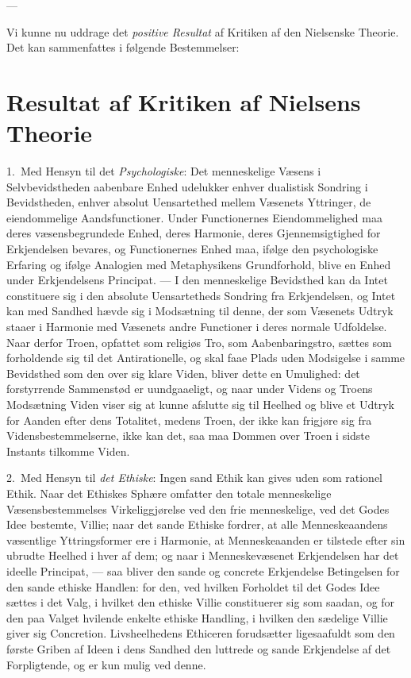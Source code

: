 \documentclass[12pt,a4paper]{book}
\newcommand{\opage}[1]{\marginnote{\footnotesize\textit{[#1]}}}
\begin{document}
\begin{center}---\end{center}

Vi kunne nu uddrage det \emph{positive Resultat} af Kritiken af den Nielsenske Theorie. Det kan
sammenfattes i følgende Bestemmelser:

\section{Resultat af Kritiken af Nielsens Theorie}
\label{sec:nielsen-resultat}

1.~Med Hensyn til det \emph{Psychologiske}: Det menneskelige Væsens i Selvbevidstheden
aabenbare Enhed udelukker enhver dualistisk Sondring i Bevidstheden, enhver absolut
Uensartethed mellem Væsenets Yttringer, de eiendommelige Aandsfunctioner. Under Functionernes
Eiendommelighed maa deres væsensbegrundede Enhed, deres Harmonie, deres Gjennemsigtighed for
Erkjendelsen bevares, og Functionernes Enhed maa, ifølge den psychologiske Erfaring og ifølge
Analogien med Metaphysikens Grundforhold, blive en Enhed under Erkjendelsens Principat. --- I
den menneskelige Bevidsthed kan da Intet constituere sig i den absolute Uensartetheds Sondring
fra Erkjendelsen, og Intet kan med Sandhed hævde sig i Modsætning til denne, der \opage{211}som Væsenets
Udtryk staaer i Harmonie med Væsenets andre Functioner i deres normale Udfoldelse. Naar derfor
Troen, opfattet som religiøs Tro, som Aabenbaringstro, sættes som forholdende sig til det
Antirationelle, og skal faae Plads uden Modsigelse i samme Bevidsthed som den over sig klare
Viden, bliver dette en Umulighed: det forstyrrende Sammenstød er uundgaaeligt, og naar under
Videns og Troens Modsætning Viden viser sig at kunne afslutte sig til Heelhed og blive et
Udtryk for Aanden efter dens Totalitet, medens Troen, der ikke kan frigjøre sig fra
Vidensbestemmelserne, ikke kan det, saa maa Dommen over Troen i sidste Instants tilkomme Viden.

2.~Med Hensyn til \emph{det Ethiske}: Ingen sand Ethik kan gives uden som rationel Ethik. Naar
det Ethiskes Sphære omfatter den totale menneskelige Væsensbestemmelses Virkeliggjørelse ved
den frie menneskelige, ved det Godes Idee bestemte, Villie; naar det sande Ethiske fordrer, at
alle Menneskeaandens væsentlige Yttringsformer ere i Harmonie, at Menneskeaanden er tilstede
efter sin ubrudte Heelhed i hver af dem; og naar i Menneskevæsenet Erkjendelsen har det ideelle
Principat, --- saa bliver den sande og concrete Erkjendelse Betingelsen for den sande ethiske
Handlen: for den, ved hvilken Forholdet til det Godes Idee sættes i det Valg, i hvilket den
ethiske Villie constituerer sig som saadan, og for den paa Valget hvilende enkelte ethiske
Handling, i hvilken den sædelige Villie giver sig Concretion. Livsheelhedens Ethiceren
forudsætter ligesaafuldt som den første Griben af Ideen i dens Sandhed den luttrede og sande
Erkjendelse af det Forpligtende, og er kun mulig ved denne.
\end{document}

